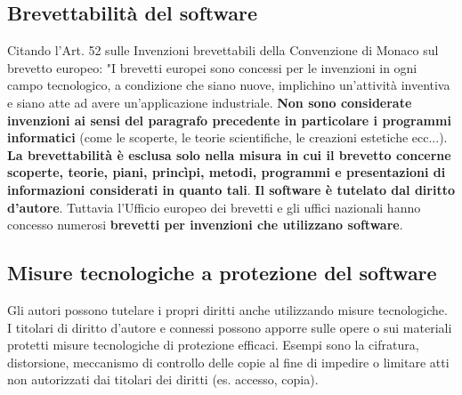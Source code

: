 \subsection{Brevettabilità del software}
Citando l'Art. 52 sulle Invenzioni brevettabili della Convenzione di Monaco sul brevetto europeo:\newline
"I brevetti europei sono concessi per le invenzioni in ogni campo tecnologico, a condizione che siano nuove,
implichino un'attività inventiva e siano atte ad avere un'applicazione industriale.\newline
\textbf{Non sono considerate invenzioni ai sensi del paragrafo precedente in particolare i programmi informatici}
(come le scoperte, le teorie scientifiche, le creazioni estetiche ecc...). \newline
\textbf{La brevettabilità è esclusa solo nella misura in cui il brevetto concerne scoperte, teorie, piani, princìpi,
metodi, programmi e presentazioni di informazioni considerati in quanto tali}.\newline
\newline
\textbf{Il software è tutelato dal diritto d'autore}. Tuttavia l'Ufficio europeo dei brevetti e gli uffici nazionali
hanno concesso numerosi \textbf{brevetti per invenzioni che utilizzano software}.

\subsection{Misure tecnologiche a protezione del software}
Gli autori possono tutelare i propri diritti anche utilizzando misure tecnologiche. \newline
I titolari di diritto d'autore e connessi possono apporre sulle opere o sui materiali
protetti misure tecnologiche di protezione efficaci. Esempi sono la cifratura, distorsione,
meccanismo di controllo delle copie al fine di impedire o limitare atti non autorizzati dai titolari
dei diritti (es. accesso, copia).

